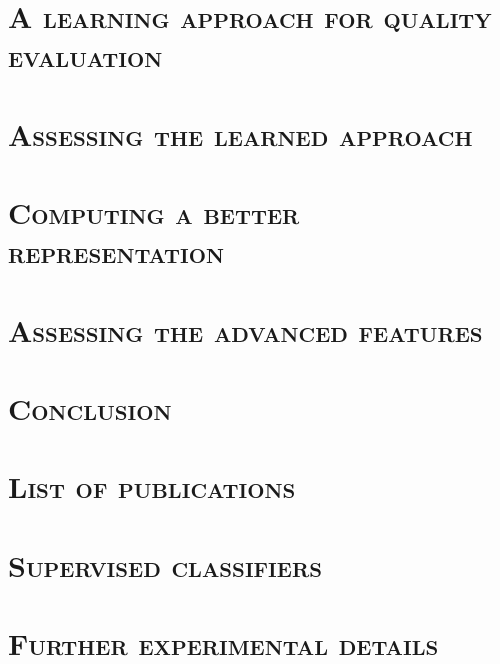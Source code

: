 \documentclass[12pt, twoside]{book}
\begin{document}
    \chapter{\textsc{A learning approach for quality evaluation}}
        \label{chap::learned_evaluation}
        

    \chapter{\textsc{Assessing the learned approach}}
        \label{chap::experiments}
        

    \chapter{\textsc{Computing a better representation}}
        \label{chap::better_representation}
        

    \chapter{\textsc{Assessing the advanced features}}
        \label{chap::advanced_experiments}
        

    \chapter{\textsc{Conclusion}}
        \label{chap::conclusion}
        

    \appendix
    \chapter{\textsc{List of publications}}
        
    \chapter{\textsc{Supervised classifiers}}
        
    \chapter{\textsc{Further experimental details}}
        

    
    \printbibliography[heading=bibintoc]
    
    
\end{document}
